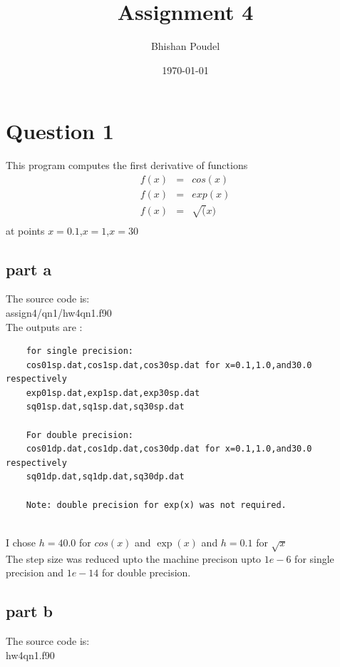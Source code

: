 \documentclass[11pt,a4paper,english]{article}
\title{Assignment 4}
\author{Bhishan Poudel}
\date{\today}
\newcommand{\beqa}{\begin{eqnarray}}
\newcommand{\eeqa}{\end{eqnarray}}
\begin{document}
\maketitle
\tableofcontents
\listoffigures
\clearpage


\section{Question 1}

	This program computes the first derivative of functions\\
	\beqa
	f(x)&=&cos(x)\\
	f(x)&=&exp(x)\\
	f(x)&=&\sqrt(x)\\
	\eeqa
	at points $x=0.1$,$x=1$,$x=30$ \\
	
	\subsection{part a}
	
	
	The source code is:\\
	assign4/qn1/hw4qn1.f90\\
	
	The outputs are :\\
	
	\begin{verbatim}
	for single precision:
	cos01sp.dat,cos1sp.dat,cos30sp.dat for x=0.1,1.0,and30.0 respectively
	exp01sp.dat,exp1sp.dat,exp30sp.dat
	sq01sp.dat,sq1sp.dat,sq30sp.dat
	
	For double precision:
	cos01dp.dat,cos1dp.dat,cos30dp.dat for x=0.1,1.0,and30.0 respectively
	sq01dp.dat,sq1dp.dat,sq30dp.dat
	
	Note: double precision for exp(x) was not required.
	
	\end{verbatim}
	I chose $h = 40.0$ for $cos(x)$ and $\exp(x)$ and $h=0.1$ for $\sqrt{x}$\\
	The step size was reduced upto the machine precison upto $1e-6$ for single precision
	and $1e-14$ for double precision.
	
	
	\subsection{part b}
	The source code is:\\
	hw4qn1.f90\\
	
\end{document}
